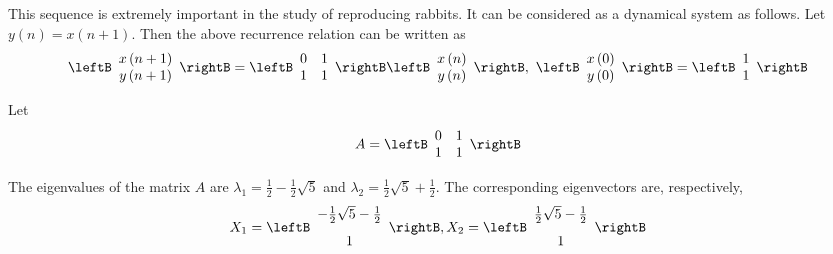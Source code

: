 \begin{solution}
This sequence is extremely important in the study of reproducing rabbits. It
can be considered as a dynamical system as follows. Let $y\left( n\right)
=x\left( n+1\right) .$ Then the above recurrence relation can be written as
\begin{equation*}
\leftB
\begin{array}{c}
x\left( n+1\right) \\
y\left( n+1\right)
\end{array}
\rightB =\leftB
\begin{array}{rr}
0 & 1 \\
1 & 1
\end{array}
\rightB \leftB
\begin{array}{c}
x\left( n\right) \\
y\left( n\right)
\end{array}
\rightB ,\ \leftB
\begin{array}{c}
x\left( 0\right) \\
y\left( 0\right)
\end{array}
\rightB =\leftB
\begin{array}{r}
1 \\
1
\end{array}
\rightB
\end{equation*}

Let 
\begin{equation*}
A
=
\leftB
\begin{array}{rr}
0 & 1 \\
1 & 1
\end{array}
\rightB
\end{equation*}

The eigenvalues of the matrix $A$ are $\lambda_1 = \frac{1}{2}-\frac{1}{2}\sqrt{5}$ and 
$\lambda_2 = \frac{1}{2}\sqrt{5}+\frac{1}{2}$. The corresponding eigenvectors are, respectively,
\begin{equation*}
X_1 = 
\leftB
\begin{array}{c}
-\vspace{0.05in}\frac{1}{2}\sqrt{5}-\vspace{0.05in}\frac{1}{2} \\
1
\end{array}
\rightB ,
X_2 = \leftB
\begin{array}{c}
\vspace{0.05in}\frac{1}{2}\sqrt{5}-\vspace{0.05in}\frac{1}{2} \\
1
\end{array}
\rightB 
\end{equation*}


\end{solution}
